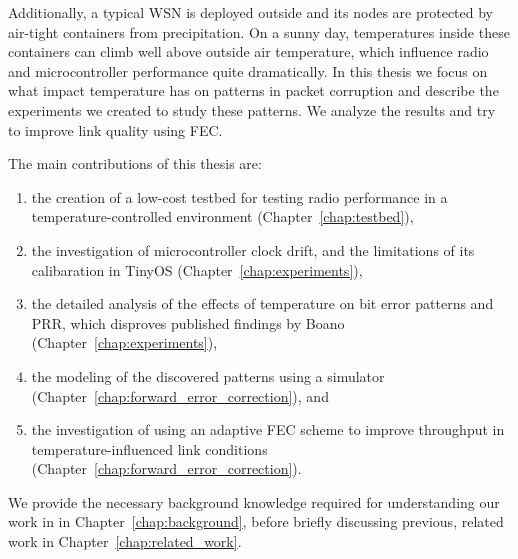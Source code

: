 Additionally, a typical \acl{WSN} is deployed outside and its nodes are protected by air-tight containers from precipitation.
On a sunny day, temperatures inside these containers can climb well above outside air temperature, which influence radio and microcontroller performance quite dramatically.
In this thesis we focus on what impact temperature has on patterns in packet corruption and describe the experiments we created to study these patterns.
We analyze the results and try to improve link quality using \acl{FEC}.

The main contributions of this thesis are:
\begin{enumerate}
  \item
  the creation of a low-cost testbed for testing radio performance in a temperature-controlled environment (Chapter~\ref{chap:testbed}),
  
  \item
  the investigation of microcontroller clock drift, and the limitations of its calibaration in TinyOS (Chapter~\ref{chap:experiments}),

  \item
  the detailed analysis of the effects of temperature on bit error patterns and \acl{PRR}, which disproves published findings by Boano \etal~\cite{Boano2013} (Chapter~\ref{chap:experiments}),
  
  \item
  the modeling of the discovered patterns using a simulator (Chapter~\ref{chap:forward_error_correction}), and

  \item
  the investigation of using an adaptive \acl{FEC} scheme to improve throughput in temperature-influenced link conditions (Chapter~\ref{chap:forward_error_correction}).
\end{enumerate}

We provide the necessary background knowledge required for understanding our work in in Chapter~\ref{chap:background}, before briefly discussing previous, related work in Chapter~\ref{chap:related_work}.




